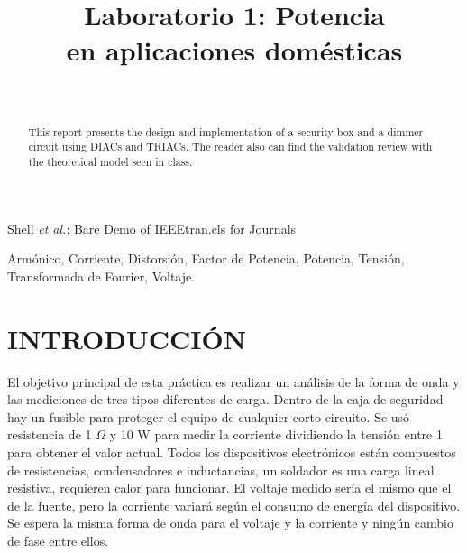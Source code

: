 \documentclass[journal]{IEEEtran}
\begin{document}
\title{\textbf{Laboratorio 1: Potencia \\ en aplicaciones domésticas}}
\author{
  \\
}

%
{Shell \MakeLowercase{\textit{et al.}}: Bare Demo of IEEEtran.cls 
for Journals}
	
\maketitle

\begin{abstract}
This report presents the design and implementation 
of a security box and a dimmer circuit using DIACs 
and TRIACs. The reader also can find  the validation 
review with the theoretical model seen in class.    
\end{abstract}


\begin{IEEEkeywords}  
Armónico, Corriente, Distorsión, Factor de Potencia,  Potencia, Tensión, Transformada de Fourier, Voltaje. 
\end{IEEEkeywords}

\IEEEpeerreviewmaketitle

\section{INTRODUCCIÓN}

El objetivo principal de esta práctica es realizar 
un análisis de la forma de onda y las mediciones 
de tres tipos diferentes de carga. Dentro de la caja 
de seguridad hay un fusible para proteger el equipo 
de cualquier corto circuito. Se usó resistencia 
de 1 $\Omega$ y 10 W para medir la corriente dividiendo 
la tensión entre 1 para obtener el valor actual. 
Todos los dispositivos electrónicos están compuestos 
de resistencias, condensadores e inductancias, un 
soldador es una carga lineal resistiva, requieren calor 
para funcionar. El voltaje medido sería el mismo que 
el de la fuente, pero la corriente variará según el 
consumo de energía del dispositivo. Se espera la misma 
forma de onda para el voltaje y la corriente y ningún 
cambio de fase entre ellos.\\
\end{document}
